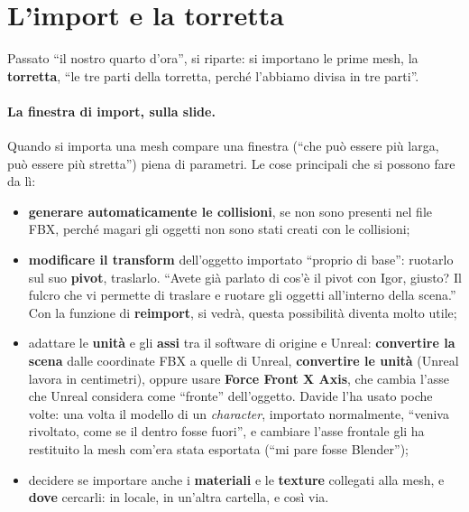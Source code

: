 \section{L'import e la torretta}
\label{ue3:sec:import}

Passato ``il nostro quarto d'ora'', si riparte: si importano le prime mesh, la
\textbf{torretta}, ``le tre parti della torretta, perché l'abbiamo divisa in tre
parti''.

\paragraph{La finestra di import, sulla slide.} Quando si importa una mesh compare una
finestra (``che può essere più larga, può essere più stretta'') piena di parametri. Le
cose principali che si possono fare da lì:
\begin{itemize}
  \item \textbf{generare automaticamente le collisioni}, se non sono presenti nel file
        FBX, perché magari gli oggetti non sono stati creati con le collisioni;
  \item \textbf{modificare il transform} dell'oggetto importato ``proprio di base'':
        ruotarlo sul suo \textbf{pivot}, traslarlo. ``Avete già parlato di cos'è il
        pivot con Igor, giusto? Il fulcro che vi permette di traslare e ruotare gli
        oggetti all'interno della scena.'' Con la funzione di \textbf{reimport}, si
        vedrà, questa possibilità diventa molto utile;
  \item adattare le \textbf{unità} e gli \textbf{assi} tra il software di origine e
        Unreal: \textbf{convertire la scena} dalle coordinate FBX a quelle di Unreal,
        \textbf{convertire le unità} (Unreal lavora in centimetri), oppure usare
        \textbf{Force Front X Axis}, che cambia l'asse che Unreal considera come
        ``fronte'' dell'oggetto. Davide l'ha usato poche volte: una volta il modello di
        un \emph{character}, importato normalmente, ``veniva rivoltato, come se il
        dentro fosse fuori'', e cambiare l'asse frontale gli ha restituito la mesh
        com'era stata esportata (``mi pare fosse Blender'');
  \item decidere se importare anche i \textbf{materiali} e le \textbf{texture}
        collegati alla mesh, e \textbf{dove} cercarli: in locale, in un'altra cartella,
        e così via.
\end{itemize}

